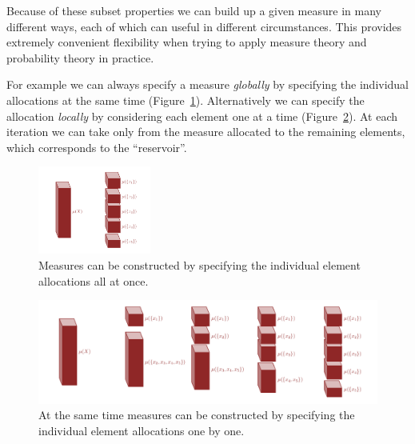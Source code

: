 \documentclass[
  letterpaper,
  DIV=11,
  numbers=noendperiod]{scrartcl}
\begin{document}
Because of these subset properties we can build up a given measure in
many different ways, each of which can useful in different
circumstances. This provides extremely convenient flexibility when
trying to apply measure theory and probability theory in practice.

For example we can always specify a measure \emph{globally} by
specifying the individual allocations at the same time
(Figure~\ref{fig-all_at_once}). Alternatively we can specify the
allocation \emph{locally} by considering each element one at a time
(Figure~\ref{fig-one_at_a_time}). At each iteration we can take only
from the measure allocated to the remaining elements, which corresponds
to the ``reservoir''.

\begin{figure}

{\centering \includegraphics[width=0.33\textwidth,height=\textheight]{figures/decompositions/all_at_once/all_at_once.pdf}

}

\caption{\label{fig-all_at_once}Measures can be constructed by
specifying the individual element allocations all at once.}

\end{figure}

\begin{figure}

{\centering \includegraphics[width=1\textwidth,height=\textheight]{figures/decompositions/one_at_a_time/one_at_a_time.pdf}

}

\caption{\label{fig-one_at_a_time}At the same time measures can be
constructed by specifying the individual element allocations one by
one.}

\end{figure}
\end{document}
